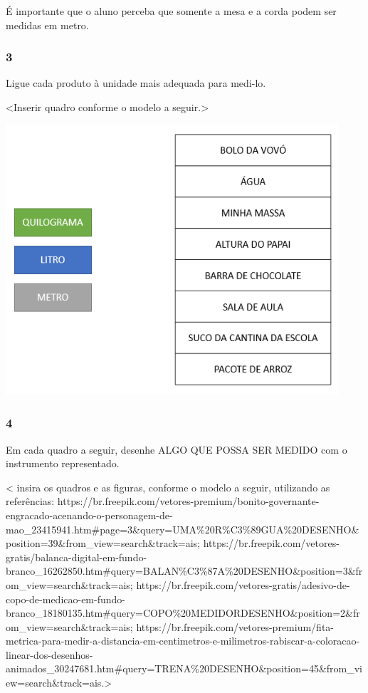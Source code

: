 É importante que o aluno perceba que somente a mesa e a
corda podem ser medidas em metro.

\subsubsection{3}\label{section-29}

Ligue cada produto à unidade mais adequada para medi-lo.

\textless{}Inserir quadro conforme o modelo a seguir.\textgreater{}

\includegraphics[width=4.86920in,height=3.96016in]{media/image25.png}

\subsubsection{4}\label{section-30}

Em cada quadro a seguir, desenhe ALGO QUE POSSA SER MEDIDO com o instrumento representado.

\textless{} insira os quadros e as figuras, conforme o modelo a seguir,
utilizando as referências:
https://br.freepik.com/vetores-premium/bonito-governante-engracado-acenando-o-personagem-de-mao\_23415941.htm\#page=3\&query=UMA\%20R\%C3\%89GUA\%20DESENHO\&position=39\&from\_view=search\&track=ais;
https://br.freepik.com/vetores-gratis/balanca-digital-em-fundo-branco\_16262850.htm\#query=BALAN\%C3\%87A\%20DESENHO\&position=3\&from\_view=search\&track=ais;
https://br.freepik.com/vetores-gratis/adesivo-de-copo-de-medicao-em-fundo-branco\_18180135.htm\#query=COPO\%20MEDIDORDESENHO\&position=2\&from\_view=search\&track=ais;
https://br.freepik.com/vetores-premium/fita-metrica-para-medir-a-distancia-em-centimetros-e-milimetros-rabiscar-a-coloracao-linear-dos-desenhos-animados\_30247681.htm\#query=TRENA\%20DESENHO\&position=45\&from\_view=search\&track=ais.\textgreater{}

